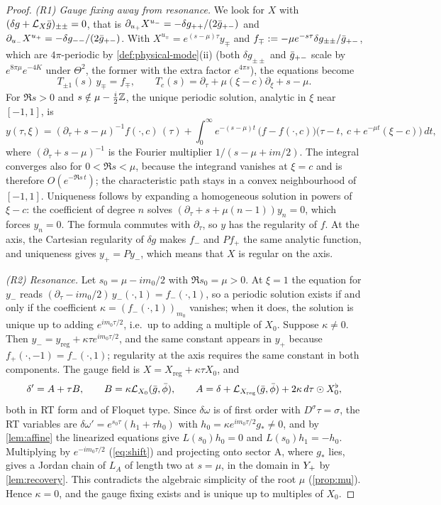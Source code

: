 \begin{proof}
\emph{(R1) Gauge fixing away from resonance.} We look for $X$ with $(\delta g+\mathcal{L}_X\bar g)_{\pm\pm}=0$, that
is $\partial_{u_+}X^{u_-}=-\delta g_{++}/(2\bar g_{+-})$ and $\partial_{u_-}X^{u_+}=-\delta g_{--}/(2\bar g_{+-})$.
With $X^{u_\mp}=e^{(s-\mu)\tau}y_\mp$ and $f_\mp:=-\mu e^{-s\tau}\delta g_{\pm\pm}/\bar g_{+-}$, which are
$4\pi$-periodic by \cref{def:physical-mode}(ii) (both $\delta g_{\pm\pm}$ and $\bar g_{+-}$ scale by
$e^{8\pi\mu}e^{-4K}$ under $\Theta^2$, the former with the extra factor $e^{4\pi s}$), the equations become
\[
  T_{\pm1}(s)\,y_\mp=f_\mp,\qquad T_c(s)=\partial_\tau+\mu(\xi-c)\partial_\xi+s-\mu .
\]
For $\Re s>0$ and $s\notin\mu-\tfrac i2\mathbb{Z}$, the unique periodic solution, analytic in $\xi$ near $[-1,1]$,
is
\begin{equation}\label{eq:transport}
  y(\tau,\xi)=(\partial_\tau+s-\mu)^{-1}f(\cdot,c)\,(\tau)
  +\int_0^\infty e^{-(s-\mu)t}\,\big(f-f(\cdot,c)\big)\big(\tau-t,\ c+e^{-\mu t}(\xi-c)\big)\,dt,
\end{equation}
where $(\partial_\tau+s-\mu)^{-1}$ is the Fourier multiplier $1/(s-\mu+im/2)$. The integral converges also
for $0<\Re s<\mu$, because the integrand vanishes at $\xi=c$ and is therefore $O(e^{-\Re s\,t})$; the
characteristic path stays in a convex neighbourhood of $[-1,1]$. Uniqueness follows by expanding a
homogeneous solution in powers of $\xi-c$: the coefficient of degree $n$ solves
$(\partial_\tau+s+\mu(n-1))y_n=0$, which forces $y_n=0$. The formula commutes with $\partial_\tau$, so $y$
has the regularity of $f$. At the axis, the Cartesian regularity of $\delta g$ makes $f_-$ and $Pf_+$ the
same analytic function, and uniqueness gives $y_+=Py_-$, which means that $X$ is regular on the axis.

\emph{(R2) Resonance.} Let $s_0=\mu-im_0/2$ with $\Re s_0=\mu>0$. At $\xi=1$ the equation for $y_-$ reads
$(\partial_\tau-im_0/2)\,y_-(\cdot,1)=f_-(\cdot,1)$, so a periodic solution exists if and only if the
coefficient $\kappa=(f_-(\cdot,1))_{m_0}$ vanishes; when it does, the solution is unique up to adding
$e^{im_0\tau/2}$, i.e.\ up to adding a multiple of $X_0$. Suppose $\kappa\neq0$. Then
$y_-=y_{\mathrm{reg}}+\kappa\tau e^{im_0\tau/2}$, and the same constant appears in $y_+$ because
$f_+(\cdot,-1)=f_-(\cdot,1)$; regularity at the axis requires the same constant in both components. The
gauge field is $X=X_{\mathrm{reg}}+\kappa\tau X_0$, and
\[
  \delta'=A+\tau B,\qquad B=\kappa\mathcal{L}_{X_0}(\bar g,\bar\phi),\qquad
  A=\delta+\mathcal{L}_{X_{\mathrm{reg}}}(\bar g,\bar\phi)+2\kappa\,d\tau\odot X_0^\flat,
\]
both in RT form and of Floquet type. Since $\delta\omega$ is of first order with $D^\sigma\tau=\sigma$, the RT
variables are $\delta\omega'=e^{s_0\tau}(h_1+\tau h_0)$ with $h_0=\kappa e^{im_0\tau/2}g_*\neq0$, and by
\cref{lem:affine} the linearized equations give $L(s_0)h_0=0$ and $L(s_0)h_1=-h_0$. Multiplying by
$e^{-im_0\tau/2}$ (\cref{eq:shift}) and projecting onto sector A, where $g_*$ lies, gives a Jordan chain
of $L_A$ of length two at $s=\mu$, in the domain in $Y_{+}$ by \cref{lem:recovery}. This contradicts the
algebraic simplicity of the root $\mu$ (\cref{prop:mu}). Hence $\kappa=0$, and the gauge fixing exists and is
unique up to multiples of $X_0$.


\end{proof}
